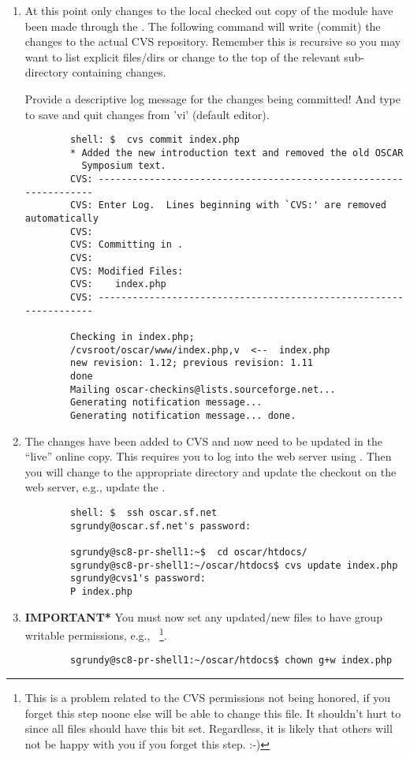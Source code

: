 \begin{enumerate}
	\item At this point only changes to the local checked out copy of the
	module have been made through the .  The following
	command will write (commit) the changes to the actual CVS repository.
	Remember this is recursive so you may want to list explicit files/dirs
	or change to the top of the relevant sub-directory containing changes.

	Provide a descriptive log message for the changes being committed!  And
	type  to save and quit changes from 'vi' (default editor).
	\begin{verbatim}
		shell: $  cvs commit index.php
		* Added the new introduction text and removed the old OSCAR
		  Symposium text.
		CVS: ------------------------------------------------------------------
		CVS: Enter Log.  Lines beginning with `CVS:' are removed automatically
		CVS:
		CVS: Committing in .
		CVS:
		CVS: Modified Files:
		CVS:    index.php
		CVS: ------------------------------------------------------------------

		Checking in index.php;
		/cvsroot/oscar/www/index.php,v  <--  index.php
		new revision: 1.12; previous revision: 1.11
		done
		Mailing oscar-checkins@lists.sourceforge.net...
		Generating notification message...
		Generating notification message... done.
	\end{verbatim}

	\item The changes have been added to CVS and now need to be updated in
	the ``live'' online copy.  This requires you to log into the web server
	using .  Then you will change to the appropriate directory and
	update the checkout on the web server, e.g., update the .
	\begin{verbatim}
		shell: $  ssh oscar.sf.net
		sgrundy@oscar.sf.net's password:

		sgrundy@sc8-pr-shell1:~$  cd oscar/htdocs/
		sgrundy@sc8-pr-shell1:~/oscar/htdocs$ cvs update index.php
		sgrundy@cvs1's password: 
		P index.php
	\end{verbatim}

	\item {\bf *IMPORTANT*} You must now set any updated/new files to have
	group writable permissions, e.g., ~\footnote{This is a
	problem related to the CVS permissions not being honored, if you forget
	this step noone else will be able to change this file.  It shouldn't
	hurt to  since all files should have this bit set.
	Regardless, it is likely that others will not be happy with you if you
	forget this step. :-)}.
	\begin{verbatim}
		sgrundy@sc8-pr-shell1:~/oscar/htdocs$ chown g+w index.php
	\end{verbatim}

\end{enumerate}



